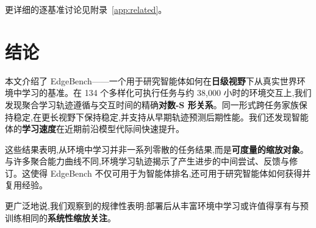 更详细的逐基准讨论见附录~\ref{app:related}。

\section{结论}
\label{sec:conclusion}

本文介绍了 EdgeBench——一个用于研究智能体如何在\textbf{日级视野}下从真实世界环境中学习的基准。在 134 个多样化可执行任务与约 38{,}000 小时的环境交互上,我们发现聚合学习轨迹遵循与交互时间的精确\textbf{对数-S 形关系}。同一形式跨任务家族保持稳定,在更长视野下保持稳定,并支持从早期轨迹预测后期性能。我们还发现智能体的\textbf{学习速度}在近期前沿模型代际间快速提升。

这些结果表明,从环境中学习并非一系列零散的任务结果,而是\textbf{可度量的缩放对象}。与许多聚合能力曲线不同,环境学习轨迹揭示了产生进步的中间尝试、反馈与修订。这使得 EdgeBench 不仅可用于为智能体排名,还可用于研究智能体如何获得并复用经验。

更广泛地说,我们观察到的规律性表明:部署后从丰富环境中学习或许值得享有与预训练相同的\textbf{系统性缩放关注}。
